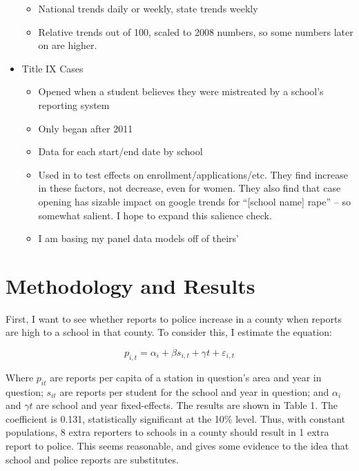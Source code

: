 \documentclass[AER,draftmode]{AEA}
\begin{document}
\begin{itemize}
\begin{itemize}
        \item National trends daily or weekly, state trends weekly
        \item Relative trends out of 100, scaled to 2008 numbers, so some numbers later on are higher.
    \end{itemize}
    \item Title IX Cases
    \begin{itemize}
        \item Opened when a student believes they were mistreated by a school's reporting system
        \item Only began after 2011
        \item Data for each start/end date by school
        \item Used in  to test effects on enrollment/applications/etc. They find increase in these factors, not decrease, even for women. They also find that case opening has sizable impact on google trends for “[school name] rape” – so somewhat salient. I hope to expand this salience check.
        \item I am basing my panel data models off of theirs'
    \end{itemize}
\end{itemize}

\section{Methodology and Results}

First, I want to see whether reports to police increase in a county when reports are high to a school in that county. To consider this, I estimate the equation: 

$$ 
p_{i,t} = \alpha_{i} + \beta s_{i,t} + \gamma{t} + \varepsilon_{i,t}
$$ 

Where $p_{it}$ are reports per capita of a station in question's area and year in question; $s_{it}$ are reports per student for the school and year in question; and $\alpha_{i}$ and $\gamma{t}$ are school and year fixed-effects. The results are shown in Table 1. The coefficient is 0.131, statistically significant at the 10\% level. Thus, with constant populations, 8 extra reporters to schools in a county should result in 1 extra report to police.  This seems reasonable, and gives some evidence to the idea that school and police reports are substitutes. 
\end{document}
